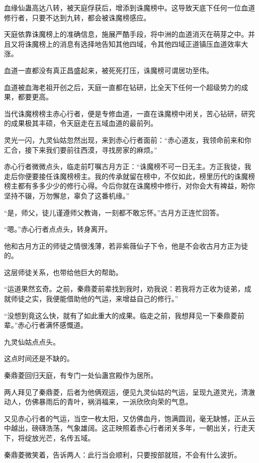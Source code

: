 \begin{this_body}
血缘仙蛊高达八转，被天庭俘获后，增添到诛魔榜中。这导致天底下任何一位血道修行者，只要不达到九转，都会被诛魔榜感应。

天庭依靠诛魔榜上的准确信息，施展严酷手段，将中洲的血道消灭在萌芽之中。并且又将诛魔榜上的消息有选择地告知其他四域，令其他四域正道镇压血道效率大涨。

血道一直都没有真正昌盛起来，被死死打压，诛魔榜可谓居功至伟。

血道被血海老祖开创之后，天庭一直都在钻研，比全天下任何一个超级势力的成果，都要更高。

当代诛魔榜榜主赤心行者，便是专修血道，一直在诛魔榜中闭关，苦心钻研，研究的成果极其丰硕，令天庭走在五域血道的最前列。

灵光一闪，九灵仙姑忽然出现，来到赤心行者面前：“赤心道友，我领命前来和你汇合，接下来我们要前往西漠，寻找房家的麻烦。”

赤心行者微微点头，临走前叮嘱古月方正：“诛魔榜不可一日无主。方正我徒，我走后你便要接任诛魔榜榜主。我的传承就留在榜中，不仅如此，榜里历代的诛魔榜榜主都有多多少少的修行心得。今后你就在诛魔榜中修行，对你会大有裨益，盼你坚持不辍，万勿懈怠，辜负了这番机缘。”

“是，师父，徒儿谨遵师父教诲，一刻都不敢忘怀。”古月方正连忙回答。

“嗯。”赤心行者点点头，转身离开。

他和古月方正的师徒之情很浅薄，若非紫薇仙子下令，他是不会收古月方正为徒的。

这层师徒关系，也带给他巨大的帮助。

“运道果然玄奇。之前，秦鼎菱前辈找到我时，劝我说：若我将方正收为徒弟，成就师徒之实，我便能借助他的气运，来增益自己的修行。”

“没想到竟这么快，就有了如此重大的成果。临走之前，我想拜见一下秦鼎菱前辈。”赤心行者满怀感慨道。

九灵仙姑点点头。

这点时间还是不缺的。

秦鼎菱回归天庭，有专门一处仙蛊宫殿作为居所。

两人拜见了秦鼎菱，后者为他俩观运，便见九灵仙姑的气运，呈现九道灵光，清澈动人，仿佛暴雨后的青叶，祸消福来，一派欣欣向荣的气息。

又见赤心行者的气运，当空一枚太阳，又仿佛血丹，饱满圆润，毫无缺憾，正从云中越出，磅礴浩荡，气象雄阔。这正映照着赤心行者闭关多年，一朝出关，行走天下，将绽放光芒，名传五域。

秦鼎菱微笑着，告诉两人：此行当会顺利，只要按部就班，不会有什么波折。


\end{this_body}
